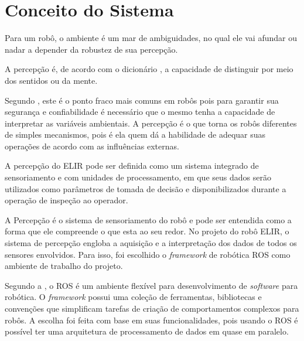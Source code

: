 \chapter{Conceito do Sistema}
\label{chap:concep}

\begin{flushright}
   \begin{list}{}{
      \setlength{\leftmargin}{4.5cm}
      \setlength{\rightmargin}{0cm}
      \setlength{\labelwidth}{0pt}
      \setlength{\labelsep}{\leftmargin}}
      \item Para um robô, o ambiente é um mar de ambiguidades, no qual ele vai afundar ou nadar a depender da robustez de sua percepção.
      \begin{list}{}{
      \setlength{\leftmargin}{0cm}
      \setlength{\rightmargin}{0cm}
      \setlength{\labelwidth}{0pt}
      \setlength{\labelsep}{\leftmargin}}
      \item \cite{Fitzpatrick}
      \end{list}
   \end{list}
\end{flushright}

A percepção é, de acordo com o dicionário , a capacidade de distinguir por meio dos sentidos ou da mente.

Segundo , este é o ponto fraco mais comuns em robôs pois para garantir sua segurança e confiabilidade é necessário que o mesmo tenha a capacidade de interpretar as variáveis ambientais. A percepção é o que torna os robôs diferentes de simples mecanismos, pois é ela quem dá a habilidade de adequar suas operações de acordo com as influências externas.

A percepção do ELIR pode ser definida como um sistema integrado de sensoriamento e com unidades de processamento, em que seus dados serão utilizados como parâmetros de tomada de decisão e disponibilizados durante a operação de inspeção ao operador.

A Percepção é o sistema de sensoriamento do robô e pode ser entendida como a forma que ele compreende o que esta ao seu redor. No projeto do robô ELIR, o sistema de percepção engloba a aquisição e a interpretação dos dados de todos os sensores envolvidos. Para isso, foi escolhido o \textit{framework} de robótica ROS como ambiente de trabalho do projeto.

Segundo a , o ROS é um ambiente flexível para desenvolvimento de \textit{software} para robótica. O \textit{framework} possui uma coleção de ferramentas, bibliotecas e convenções que simplificam tarefas de criação de comportamentos complexos para robôs. A escolha foi feita com base em suas funcionalidades, pois usando o ROS é possível ter uma arquitetura de processamento de dados em quase em paralelo.

